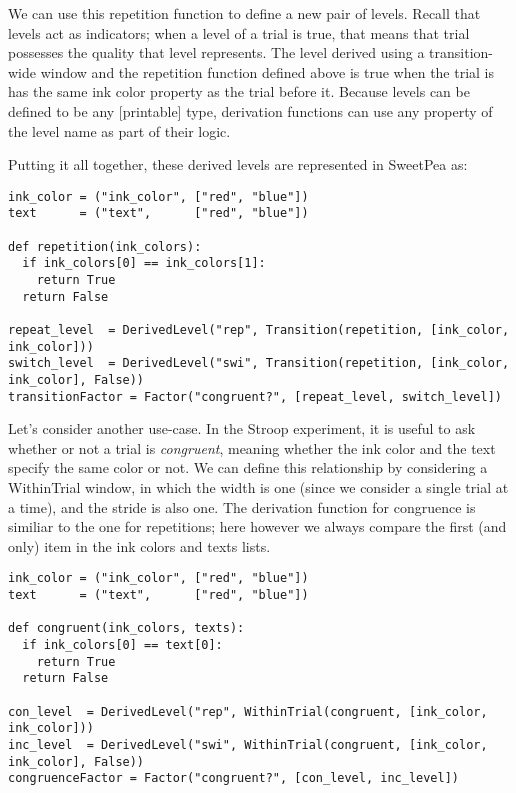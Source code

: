 We can use this repetition function to define a new pair of levels. Recall that levels act as indicators; when a level of a trial is true, that means that trial possesses the quality that level represents. The level derived using a transition-wide window and the repetition function defined above is true when the trial is has the same ink color property as the trial before it. Because levels can be defined to be any [printable] type, derivation functions can use any property of the level name as part of their logic.

Putting it all together, these derived levels are represented in SweetPea as:

\begin{verbatim}
ink_color = ("ink_color", ["red", "blue"])
text      = ("text",      ["red", "blue"])

def repetition(ink_colors):
  if ink_colors[0] == ink_colors[1]:
    return True
  return False

repeat_level  = DerivedLevel("rep", Transition(repetition, [ink_color, ink_color]))
switch_level  = DerivedLevel("swi", Transition(repetition, [ink_color, ink_color], False))
transitionFactor = Factor("congruent?", [repeat_level, switch_level])

\end{verbatim}

Let's consider another use-case. In the Stroop experiment, it is useful to ask whether or not a trial is \emph{congruent}, meaning whether the ink color and the text specify the same color or not. We can define this relationship by considering a WithinTrial window, in which the width is one (since we consider a single trial at a time), and the stride is also one. The derivation function for congruence is similiar to the one for repetitions; here however we always compare the first (and only) item in the ink colors and texts lists.

\begin{verbatim}
ink_color = ("ink_color", ["red", "blue"])
text      = ("text",      ["red", "blue"])

def congruent(ink_colors, texts):
  if ink_colors[0] == text[0]:
    return True
  return False

con_level  = DerivedLevel("rep", WithinTrial(congruent, [ink_color, ink_color]))
inc_level  = DerivedLevel("swi", WithinTrial(congruent, [ink_color, ink_color], False))
congruenceFactor = Factor("congruent?", [con_level, inc_level])

\end{verbatim}

